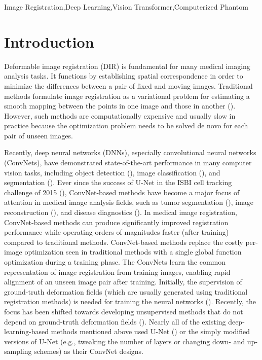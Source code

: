 \documentclass[times,twocolumn,final]{elsarticle}
\begin{document}
\begin{frontmatter}
\begin{keyword}
\KWD Image Registration\sep Deep Learning\sep Vision Transformer\sep Computerized Phantom
\end{keyword}

\end{frontmatter}
\thispagestyle{empty}


\section{Introduction}
\label{sec1}
Deformable image registration (DIR) is fundamental for many medical imaging analysis tasks. It functions by establishing spatial correspondence in order to minimize the differences between a pair of fixed and moving images. Traditional methods formulate image registration as a variational problem for estimating a smooth mapping between the points in one image and those in another (\cite{avants2008symmetric, beg2005computing, vercauteren2009diffeomorphic, heinrich2013mrf, modat2010fast}). However, such methods are computationally expensive and usually slow in practice because the optimization problem needs to be solved de novo for each pair of unseen images.

Recently, deep neural networks (DNNs), especially convolutional neural networks (ConvNets), have demonstrated state-of-the-art performance in many computer vision tasks, including object detection (\cite{redmon2016you}), image classification (\cite{he2016deep}), and segmentation (\cite{long2015fully}). Ever since the success of U-Net in the ISBI cell tracking challenge of 2015 (\cite{ronneberger2015u}), ConvNet-based methods have become a major focus of attention in medical image analysis fields, such as tumor segmentation (\cite{isensee2021nnu, zhou2019unet++}), image reconstruction (\cite{zhu2018image}), and disease diagnostics (\cite{lian2018hierarchical}). In medical image registration, ConvNet-based methods can produce significantly improved registration performance while operating orders of magnitudes faster (after training) compared to traditional methods. ConvNet-based methods replace the costly per-image optimization seen in traditional methods with a single global function optimization during a training phase. The ConvNets learn the common representation of image registration from training images, enabling rapid alignment of an unseen image pair after training. Initially, the supervision of ground-truth deformation fields (which are usually generated using traditional registration methods) is needed for training the neural networks (\cite{onofrey2013semi, yang2017quicksilver, rohe2017svf}). Recently, the focus has been shifted towards developing unsupervised methods that do not depend on ground-truth deformation fields (\cite{balakrishnan2019voxelmorph, dalca2019unsupervised, kim2021cyclemorph, de2019deep, de2017end, lei20204d, chen2020generating, zhang2018inverse}). Nearly all of the existing deep-learning-based methods mentioned above used U-Net (\cite{ronneberger2015u}) or the simply modified versions of U-Net (e.g., tweaking the number of layers or changing down- and up-sampling schemes) as their ConvNet designs.
\end{document}
